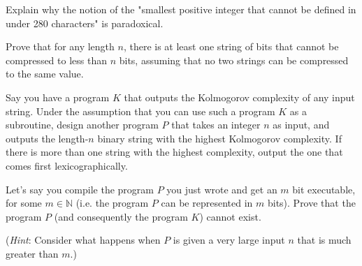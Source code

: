 \documentclass[11pt]{article}
\begin{document}
\begin{Parts}

\Part
Explain why the notion of the "smallest positive integer that cannot be defined in under 280 characters" is paradoxical.

\Part
Prove that for any length $n$, there is at least one string of bits that cannot be compressed to less than $n$ bits, assuming that no two strings can be compressed to the same value.

\Part
Say you have a program $K$ that outputs the Kolmogorov complexity of any input
string. Under the assumption that you can use such a program $K$ as a
subroutine, design another program $P$ that takes an integer $n$ as input, and
outputs the length-$n$ binary string with the highest Kolmogorov complexity. If
there is more than one string with the highest complexity, output the one that
comes first lexicographically.

\Part
Let's say you compile the program $P$ you just wrote and get an $m$ bit
executable, for some $m \in \mathbb N$ (i.e. the program $P$ can be represented
in $m$ bits). Prove that the program $P$ (and consequently the program $K$)
cannot exist.

(\textit{Hint}: Consider what happens when $P$ is given a very large input $n$ that is much greater than $m$.)

\end{Parts}
\end{document}
